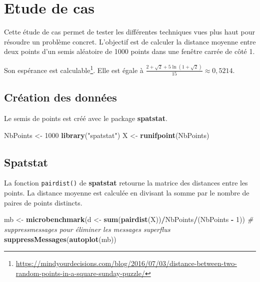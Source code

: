 \documentclass[
  12pt,
  french,
  a4paper,
  extrafontsizes,onecolumn,openright
  ]{memoir}
\newenvironment{Shaded}{\begin{snugshade}}{\end{snugshade}}
\newcommand{\CommentTok}[1]{\textcolor[rgb]{0.56,0.35,0.01}{\textit{#1}}}
\newcommand{\DecValTok}[1]{\textcolor[rgb]{0.00,0.00,0.81}{#1}}
\newcommand{\KeywordTok}[1]{\textcolor[rgb]{0.13,0.29,0.53}{\textbf{#1}}}
\newcommand{\NormalTok}[1]{#1}
\newcommand{\OperatorTok}[1]{\textcolor[rgb]{0.81,0.36,0.00}{\textbf{#1}}}
\newcommand{\StringTok}[1]{\textcolor[rgb]{0.31,0.60,0.02}{#1}}
\newlength{\rf}
\begin{document}
\hypertarget{sec:cas}{%
\section{Etude de cas}\label{sec:cas}}

Cette étude de cas permet de tester les différentes techniques vues plus haut pour résoudre un problème concret.
L'objectif est de calculer la distance moyenne entre deux points d'un semis aléatoire de 1000 points dans une fenêtre carrée de côté 1.

Son espérance est calculable\footnote{\url{https://mindyourdecisions.com/blog/2016/07/03/distance-between-two-random-points-in-a-square-sunday-puzzle/}}.
Elle est égale à \(\frac{2+\sqrt{2}+5\ln{(1+\sqrt{2})}}{15} \approx 0,5214\).

\hypertarget{cruxe9ation-des-donnuxe9es}{%
\subsection{Création des données}\label{cruxe9ation-des-donnuxe9es}}

Le semis de points est créé avec le package \textbf{spatstat}.

\scriptsize

\begin{Shaded}
\begin{Highlighting}[]
\NormalTok{NbPoints <-}\StringTok{ }\DecValTok{1000}
\KeywordTok{library}\NormalTok{(}\StringTok{"spatstat"}\NormalTok{)}
\NormalTok{X <-}\StringTok{ }\KeywordTok{runifpoint}\NormalTok{(NbPoints)}
\end{Highlighting}
\end{Shaded}

\normalsize

\hypertarget{spatstat}{%
\subsection{Spatstat}\label{spatstat}}

La fonction \texttt{pairdist()} de \textbf{spatstat} retourne la matrice des distances entre les points.
La distance moyenne est calculée en divisant la somme par le nombre de paires de points distincts.

\scriptsize

\begin{Shaded}
\begin{Highlighting}[]
\NormalTok{mb <-}\StringTok{ }\KeywordTok{microbenchmark}\NormalTok{(d <-}\StringTok{ }\KeywordTok{sum}\NormalTok{(}\KeywordTok{pairdist}\NormalTok{(X))}\OperatorTok{/}\NormalTok{NbPoints}\OperatorTok{/}\NormalTok{(NbPoints }\OperatorTok{-}
\StringTok{    }\DecValTok{1}\NormalTok{))}
\CommentTok{# suppressmessages pour éliminer les messages superflus}
\KeywordTok{suppressMessages}\NormalTok{(}\KeywordTok{autoplot}\NormalTok{(mb))}
\end{Highlighting}
\end{Shaded}
\end{document}
